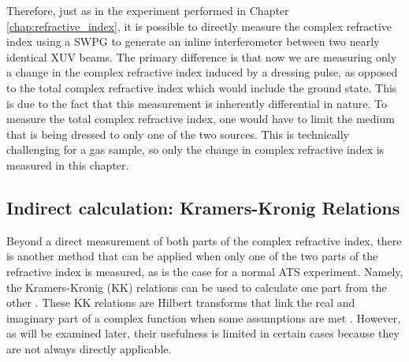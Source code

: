 Therefore, just as in the experiment performed in Chapter \ref{chap:refractive_index}, it is possible to directly measure the complex refractive index using a SWPG to generate an inline interferometer between two nearly identical XUV beams.  The primary difference is that now we are measuring only a change in the complex refractive index induced by a dressing pulse, as opposed to the total complex refractive index which would include the ground state.  This is due to the fact that this measurement is inherently differential in nature.  To measure the total complex refractive index, one would have to limit the medium that is being dressed to only one of the two sources.  This is technically challenging for a gas sample, so only the change in complex refractive index is measured in this chapter.


\subsection{Indirect calculation: Kramers-Kronig Relations}

Beyond a direct measurement of both parts of the complex refractive index, there is another method that can be applied when only one of the two parts of the refractive index is measured, as is the case for a normal ATS experiment.  Namely, the Kramers-Kronig (KK) relations can be used to calculate one part from the other \cite{kronigTheoryDispersionXRays1926, kramersDiffusionLumierePar1927}.  These KK relations are Hilbert transforms that link the real and imaginary part of a complex function when some assumptions are met \cite{lucariniKramersKronigRelationsOptical2005}.  However, as will be examined later, their usefulness is limited in certain cases because they are not always directly applicable.


